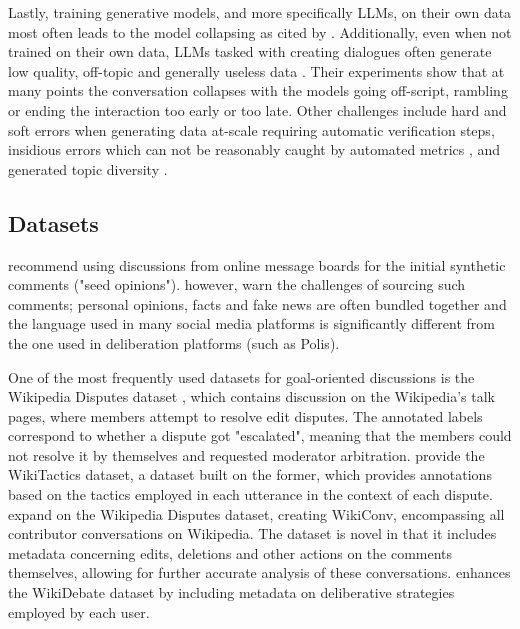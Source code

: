 Lastly, training generative models, and more specifically LLMs, on their own data most often leads to the model collapsing \cite{alemohammad2023selfconsuminggenerativemodelsmad, shumailov2024curserecursiontraininggenerated} as cited by \cite{ulmer2024bootstrappingllmbasedtaskorienteddialogue}. Additionally, even when not trained on their own data, LLMs tasked with creating dialogues often generate low quality, off-topic and generally useless data \cite{ulmer2024bootstrappingllmbasedtaskorienteddialogue}. Their experiments show that at many points the conversation collapses with the models going off-script, rambling or ending the interaction too early or too late. Other challenges include hard and soft errors when generating data at-scale \cite{lambert2024selfdirectedsyntheticdialoguesrevisions, ulmer2024bootstrappingllmbasedtaskorienteddialogue} requiring automatic verification steps, insidious errors which can not be reasonably caught by automated metrics \cite{lambert2024selfdirectedsyntheticdialoguesrevisions, ulmer2024bootstrappingllmbasedtaskorienteddialogue}, and generated topic diversity \cite{lambert2024selfdirectedsyntheticdialoguesrevisions}.

\subsection{Datasets}
\label{sec:related:datasets}

\cite{small-polis-llm} recommend using discussions from online message boards for the initial synthetic comments ("seed opinions"). \cite{vecchi-2021-towards} however, warn the challenges of sourcing such comments; personal opinions, facts and fake news are often bundled together and the language used in many social media platforms is significantly different from the one used in deliberation platforms (such as Polis).

One of the most frequently used datasets for goal-oriented discussions is the Wikipedia Disputes dataset \cite{de-kock-vlachos-2021-beg}, which contains discussion on the Wikipedia's talk pages, where members attempt to resolve edit disputes. The annotated labels correspond to whether a dispute got "escalated", meaning that the members could not resolve it by themselves and requested moderator arbitration. \cite{dekock2022disagree} provide the WikiTactics dataset, a dataset built on the former, which provides annotations based on the tactics employed in each utterance in the context of each dispute. \cite{hua2018wikiconvcorpuscompleteconversational} expand on the Wikipedia Disputes dataset, creating WikiConv, encompassing all contributor conversations on Wikipedia. The dataset is novel in that it includes metadata concerning edits, deletions and other actions on the comments themselves, allowing for further accurate analysis of these conversations. \cite{al-khatib-etal-2018-modeling} enhances the WikiDebate dataset by including metadata on deliberative strategies employed by each user.

